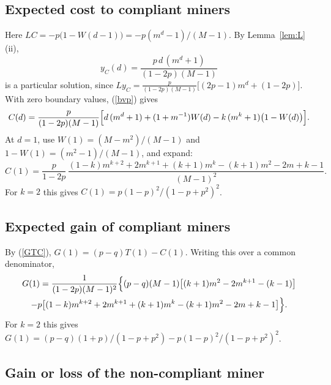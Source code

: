 \documentclass{article}%
\begin{document}
\subsection{Expected cost to compliant miners}

Here $LC=-p\bigl(1-W(d-1)\bigr)=-p(m^{d}-1)/(M-1)$. By Lemma~\ref{lem:L}(ii),
\[
y_{C}(d)=\frac{p\,d\,(m^{d}+1)}{(1-2p)(M-1)}%
\]
is a particular solution, since $Ly_{C}=\frac{p}{(1-2p)(M-1)}\bigl[(2p-1)m^{d}%
+(1-2p)\bigr]$. With zero boundary values, (\ref{bvp}) gives%
\begin{equation}
C(d)=\frac{p}{(1-2p)(M-1)}\Bigl[d\,(m^{d}+1)+(1+m^{-1})W(d)-k\,(m^{k}%
+1)\bigl(1-W(d)\bigr)\Bigr]. \label{Cgen}%
\end{equation}
At $d=1$, use $W(1)=(M-m^{2})/(M-1)$ and $1-W(1)=(m^{2}-1)/(M-1)$, and expand:%
\begin{equation}
C(1)=\frac{p}{1-2p}\,\frac{(1-k)m^{k+2}+2m^{k+1}+(k+1)m^{k}-(k+1)m^{2}%
-2m+k-1}{(M-1)^{2}}. \label{eyecandy}%
\end{equation}
For $k=2$ this gives $C(1)=p(1-p)^{2}/(1-p+p^{2})^{2}$.

\subsection{Expected gain of compliant miners}

By (\ref{GTC}), $G(1)=(p-q)T(1)-C(1)$. Writing this over a common
denominator,%
\begin{multline}
G(1)=\frac{1}{(1-2p)(M-1)^{2}}\Bigl\{(p-q)(M-1)\bigl[(k+1)m^{2}-2m^{k+1}%
-(k-1)\bigr]\\
-p\bigl[(1-k)m^{k+2}+2m^{k+1}+(k+1)m^{k}-(k+1)m^{2}-2m+k-1\bigr]\Bigr\}.
\label{G_app}%
\end{multline}
For $k=2$ this gives $G(1)=(p-q)(1+p)/(1-p+p^{2})-p(1-p)^{2}/(1-p+p^{2})^{2}$.

\subsection{Gain or loss of the non-compliant miner}
\end{document}
